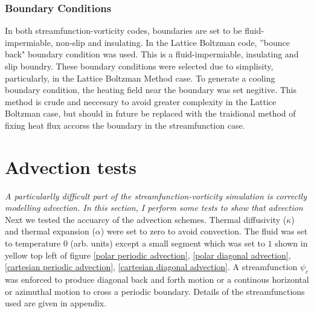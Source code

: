 \documentclass{article}
\begin{document}
\subsubsection*{Boundary Conditions}
In both streamfunction-vorticity codes, boundaries are set to be fluid-impermiable, non-slip and insulating. In the Lattice Boltzman code, ''bounce back" boundary condition was used. This is a fluid-impermiable, insulating and slip boundry. These boundary conditions were selected due to simplisity, particularly, in the Lattice Boltzman Method case. To generate a cooling boundary condition, the heating field near the boundary was set negitive. This method is crude and neccesary to avoid greater complexity in the Lattice Boltzman case, but should in future be replaced with the traidional method of fixing heat flux accorss the boundary in the streamfunction case.



\section*{Advection tests}
{\it{A particularlly difficult part of the streamfunction-vorticity simulation is correctly modelling advection. In this section, I perform some tests to show that advection }}
\vspace{0.3cm}
\noindent Next we tested the accuarcy of the advection schemes. Thermal diffusivity ($\kappa$) and thermal expansion ($\alpha$) were set to zero to avoid convection. The fluid was set to temperature 0 (arb. units) except a small segment which was set to $1$ shown in yellow top left of figure \ref{polar periodic advection}, \ref{polar diagonal advection}, \ref{cartesian periodic advection}, \ref{cartesian diagonal advection}. A streamfunction $\psi_c$ was enforced to produce diagonal back and forth motion or a continous horizontal or azimuthal motion to cross a periodic boundary. Details of the streamfunctions used are given in appendix.
\end{document}
